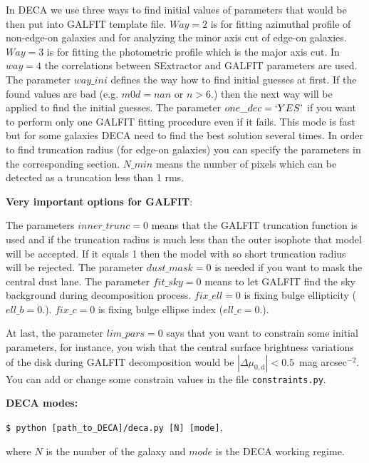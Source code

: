 \documentclass[
aps,%
12pt,%
final,%
notitlepage,%
oneside,%
onecolumn,%
nobibnotes,%
nofootinbib,%
superscriptaddress,%
noshowpacs,%
centertags]%
{revtex4}
\begin{document}
In DECA we use three ways to find initial values of parameters that would be then put into GALFIT template file. $Way = 2$ is for fitting  azimuthal profile of non-edge-on galaxies and for analyzing the minor axis cut of edge-on galaxies. $Way = 3$ is for fitting the photometric profile which is the major axis cut. In $way = 4$ the correlations between SExtractor and GALFIT parameters are used.
The parameter $way\_ini$ defines the way how to find initial guesses at first. If the found values are bad (e.g. $m0d=nan$ or $n>6.$) then the next way will be applied to find the initial guesses. 
The parameter $one\_dec=`YES\textrm'$ if you want to perform only one GALFIT fitting procedure even if it fails. This mode is fast but for some galaxies DECA need to find the best solution several times.     
In order to find truncation radius (for edge-on galaxies) you can specify the parameters in the corresponding section. $N\_min$ means the number of pixels which can be detected as a truncation less than 1 rms.

\centerline{\textbf{Very important options for GALFIT}:}

The parameters $inner\_trunc = 0$ means that the GALFIT truncation function is used and if the truncation radius is much less than the outer isophote that model will be accepted. If it equals 1 then the model with so short truncation radius will be rejected. 			
The parameter $dust\_mask = 0$ is needed if you want to mask the central dust lane.
The parameter $fit\_sky = 0$ means to let GALFIT find the sky background during decomposition process.			
$fix\_ell = 0$ is fixing bulge ellipticity ($ell\_b=0.$).
$fix\_c = 0$ is fixing bulge ellipse index ($ell\_c=0.$). 

At last, the parameter $lim\_pars=0$ says that you want to constrain some initial parameters, for instance, you wish that the central surface brightness variations of the disk during GALFIT decomposition would be $|\Delta \mu_\mathrm{0,d}|<0.5$~mag arcsec$^{-2}$. You can add or change some constrain values in the file \texttt{constraints.py}.   
\newline

\centerline{\textbf{DECA modes:}}
\texttt{\$ python [path\_to\_DECA]/deca.py [N] [mode]},

where $N$ is the number of the galaxy and $mode$ is the DECA working regime.
\end{document}
